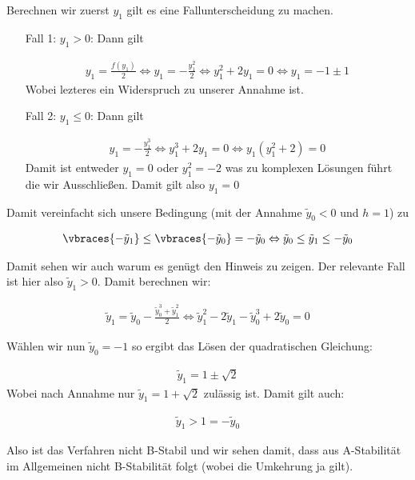 \begin{solution}
\begin{itemize}
    Berechnen wir zuerst $y_1$ gilt es eine Fallunterscheidung zu machen.
    \begin{itemize}
      \item[Fall 1: $y_1 > 0$:] Dann gilt

        \begin{align*}
          y_1 = \frac{f(y_1)}{2} \Leftrightarrow y_1 = -\frac{y_1^2}{2}
          \Leftrightarrow y_1^2 + 2y_1 = 0 \Leftrightarrow y_1 = -1 \pm 1
        \end{align*}
        Wobei lezteres ein Widerspruch zu unserer Annahme ist.
      \item[Fall 2: $y_1 \leq 0$:] Dann gilt

      \begin{align*}
        y_1 = - \frac{y_1^3}{2} \Leftrightarrow y_1^3 +2y_1 = 0 \Leftrightarrow
        y_1(y_1^2+2)=0
      \end{align*}
      Damit ist entweder $y_1 = 0$ oder $y_1^2=-2$ was zu komplexen Lösungen führt
      die wir Ausschließen. Damit gilt also $y_1 = 0$
    \end{itemize}
    Damit vereinfacht sich unsere Bedingung (mit der Annahme $\tilde{y}_0 < 0$
    und $h=1$) zu

    \begin{align*}
      \vbraces{-\tilde{y}_1} \leq \vbraces{-\tilde{y}_0} = -\tilde{y}_0 \Leftrightarrow
      \tilde{y}_0 \leq \tilde{y}_1 \leq -\tilde{y}_0
    \end{align*}

    Damit sehen wir auch warum es genügt den Hinweis zu zeigen. Der relevante Fall
    ist hier also $\tilde{y}_1 > 0$. Damit berechnen wir:

    \begin{align*}
      \tilde{y}_1 = \tilde{y}_0 - \frac{\tilde{y}_0^3 +\tilde{y}_1^2}{2} \Leftrightarrow
      \tilde{y}_1^2 - 2\tilde{y}_1 - \tilde{y}_0^3+2\tilde{y}_0 = 0
    \end{align*}

    Wählen wir nun $\tilde{y}_0 = -1$ so ergibt das Lösen der quadratischen Gleichung:

    \begin{align*}
      \tilde{y}_1 = 1 \pm \sqrt{2}
    \end{align*}
    Wobei nach Annahme nur $\tilde{y}_1 = 1+ \sqrt{2}$ zulässig ist. Damit gilt auch:

    \begin{align*}
      \tilde{y}_1 > 1 = -\tilde{y}_0
    \end{align*}

    Also ist das Verfahren nicht B-Stabil und wir sehen damit, dass aus A-Stabilität
    im Allgemeinen nicht B-Stabilität folgt (wobei die Umkehrung ja gilt).
 \end{itemize}
\end{solution}
